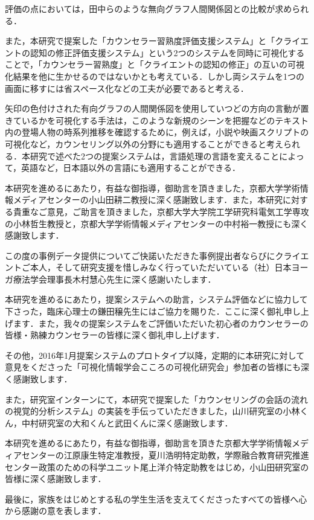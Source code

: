 \documentclass[shuuron]{kuee}
\begin{document}
評価の点においては，田中ら\cite{tanaka}のような無向グラフ人間関係図との比較が求められる．

また，本研究で提案した「カウンセラー習熟度評価支援システム」と「クライエントの認知の修正評価支援システム」という2つのシステムを同時に可視化することで，「カウンセラー習熟度」と「クライエントの認知の修正」の互いの可視化結果を他に生かせるのではないかとも考えている．しかし両システムを1つの画面に移すには省スペース化などの工夫が必要であると考える．

矢印の色付けされた有向グラフの人間関係図を使用していつどの方向の言動が置きているかを可視化する手法は，このような新規のシーンを把握などのテキスト内の登場人物の時系列推移を確認するために，例えば，小説や映画スクリプトの可視化など，カウンセリング以外の分野にも適用することができると考えられる．本研究で述べた2つの提案システムは，言語処理の言語を変えることによって，英語など，日本語以外の言語にも適用することができる．


\begin{acknowledgements}

  本研究を進めるにあたり，有益な御指導，御助言を頂きました，京都大学学術情報メディアセンターの小山田耕二教授に深く感謝致します．また，本研究に対する貴重なご意見，ご助言を頂きました，京都大学大学院工学研究科電気工学専攻の小林哲生教授と，京都大学学術情報メディアセンターの中村裕一教授にも深く感謝致します．

  この度の事例データ提供についてご快諾いただきた事例提出者ならびにクライエントご本人，そして研究支援を惜しみなく行っていただいている（社）日本ヨーガ療法学会理事長木村慧心先生に深く感謝いたします．

  本研究を進めるにあたり，提案システムへの助言，システム評価などに協力して下さった，臨床心理士の鎌田穣先生にはご協力を賜りた．ここに深く御礼申し上げます．また，我々の提案システムをご評価いただいた初心者のカウンセラーの皆様・熟練カウンセラーの皆様に深く御礼申し上げます．

  その他，2016年1月提案システムのプロトタイプ以降，定期的に本研究に対して意見をくださった「可視化情報学会こころの可視化研究会」参加者の皆様にも深く感謝致します．

  また，研究室インターンにて，本研究で提案した「カウンセリングの会話の流れの視覚的分析システム」の実装を手伝っていただきました，山川研究室の小林くん，中村研究室の大和くんと武田くんに深く感謝致します．

  本研究を進めるにあたり，有益な御指導，御助言を頂きた京都大学学術情報メディアセンターの江原康生特定准教授，夏川浩明特定助教，学際融合教育研究推進センター政策のための科学ユニット尾上洋介特定助教をはじめ，小山田研究室の皆様に深く感謝致します．



  最後に，家族をはじめとする私の学生生活を支えてくださったすべての皆様へ心から感謝の意を表します．
\end{acknowledgements}
\end{document}
